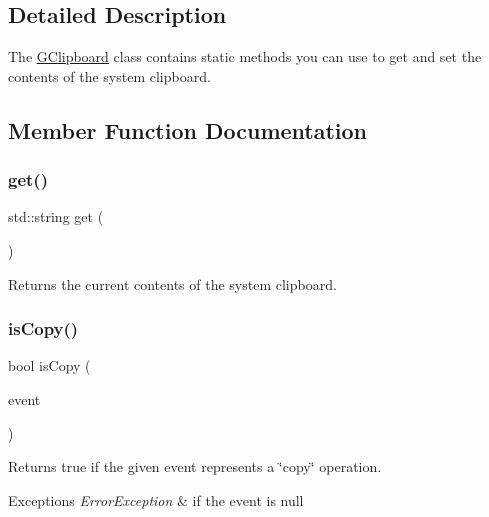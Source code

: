\subsection{Detailed Description}
The \mbox{\hyperlink{classGClipboard}{G\+Clipboard}} class contains static methods you can use to get and set the contents of the system clipboard. 

\subsection{Member Function Documentation}
\mbox{\label{classGClipboard_a4879b26a87a0b49f7d535c7a669620f6}} 
\subsubsection{\texorpdfstring{get()}{get()}}
{\footnotesize\ttfamily std\+::string get (\begin{DoxyParamCaption}{ }\end{DoxyParamCaption})\hspace{0.3cm}{\ttfamily [static]}}



Returns the current contents of the system clipboard. 

\mbox{\label{classGClipboard_a813cbc957e264a1846175ece316757d3}} 
\subsubsection{\texorpdfstring{is\+Copy()}{isCopy()}}
{\footnotesize\ttfamily bool is\+Copy (\begin{DoxyParamCaption}\item[{Q\+Key\+Event $\ast$}]{event }\end{DoxyParamCaption})\hspace{0.3cm}{\ttfamily [static]}}



Returns true if the given event represents a \char`\"{}copy\char`\"{} operation. 


\begin{DoxyExceptions}{Exceptions}
{\em Error\+Exception} & if the event is null \\
\hline
\end{DoxyExceptions}
\mbox{\label{classGClipboard_a5ea46b856cb8eae1295b1e2b7db664aa}} 
